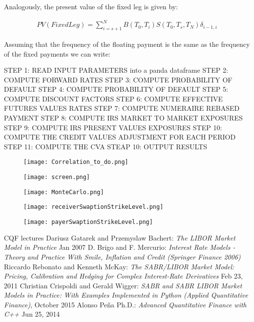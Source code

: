 \documentclass[11pt]{article}
\numberwithin{equation}{subsection}
\begin{document}
Analogously, the present value of the fixed leg is given by:

\begin{eqnarray*}
	PV(Fixed Leg) = \sum_{i=s+1}^{N} B(T_0, T_{i}) S(T_{0}, T_{s}, T_{N}) \delta_{i−1,i} 
\end{eqnarray*}

Assuming that the frequency of the floating payment is the same as the frequency of the
fixed payments we can write:
	
STEP 1: READ INPUT PARAMETERS into a panda dataframe
STEP 2: COMPUTE FORWARD RATES
STEP 3: COMPUTE PROBABILITY OF DEFAULT
STEP 4: COMPUTE PROBABILITY OF DEFAULT
STEP 5: COMPUTE DISCOUNT FACTORS
STEP 6: COMPUTE EFFECTIVE FUTURES VALUES RATES
STEP 7: COMPUTE NUMERAIRE REBASED PAYMENT
STEP 8: COMPUTE IRS MARKET TO MARKET EXPOSURES
STEP 9: COMPUTE IRS PRESENT VALUES EXPOSURES
STEP 10: COMPUTE THE CREDIT VALUES ADJUSTMENT FOR EACH PERIOD
STEP 11: COMPUTE THE CVA 
STEAP 10: OUTPUT RESULTS


\begin{figure}[H]
	\texttt{[image: Correlation\_to\_do.png]}
\end{figure}

\begin{figure}[H]
	\texttt{[image: screen.png]}
\end{figure}

\begin{figure}[H]
	\texttt{[image: MonteCarlo.png]}
\end{figure}

\begin{figure}[H]
	\texttt{[image: receiverSwaptionStrikeLevel.png]}
\end{figure}

\begin{figure}[H]
	\texttt{[image: payerSwaptionStrikeLevel.png]}
\end{figure}



{\small
\begin{thebibliography}{99}
	  CQF lectures 
	  Dariusz Gatarek and Przemyslaw Bachert: 
	\emph{The LIBOR Market Model in Practice} Jan 2007
	 D. Brigo and F. Mercurio: 
	\emph{Interest Rate Models - Theory and Practice With Smile, Inflation and Credit (Springer Finance 2006)}
	 Riccardo Rebonato and Kenneth McKay: 
	\emph{The SABR/LIBOR Market Model: Pricing, Calibration and Hedging for Complex Interest-Rate Derivatives} Feb 23, 2011	 Christian Crispoldi and Gerald Wigger:
	\emph{SABR and SABR LIBOR Market Models in Practice: With Examples Implemented in Python (Applied Quantitative Finance)}, October 2015
	 Alonso Peña Ph.D.:
	\emph{Advanced Quantitative Finance with C++} Jun 25, 2014		 
\end{thebibliography}
}
\end{document}
